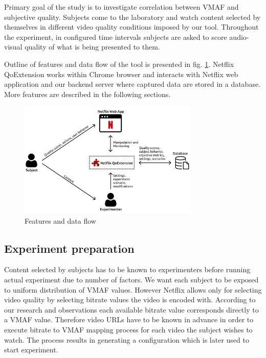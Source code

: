 \documentclass[conference]{IEEEtran}
\begin{document}
Primary goal of the study is to investigate correlation between VMAF \cite{VMAF} and subjective quality. 
Subjects come to the laboratory and watch content selected by themselves in different video quality conditions imposed by our tool. 
Throughout the experiment, in configured time intervals subjects are asked to score audio-visual quality of what is being presented to them.

Outline of features and data flow of the tool is presented in fig. \ref{Figure:fig_features}.
Netflix QoExtension works within Chrome browser and interacts with Netflix web application and our backend server where captured data are stored in a database. More features are described in the following sections.

\begin{figure}[h]
      \includegraphics[width=3.38in]{assets/NetflixQoExtensionV2.png}
      \caption{Features and data flow}
      \label{Figure:fig_features}
\end{figure}

\subsection{Experiment preparation}
Content selected by subjects has to be known to experimenters before running actual experiment due to number of factors. We want each subject to be exposed to uniform distribution of VMAF values. However Netflix allows only for selecting video quality by selecting bitrate values the video is encoded with. According to our research and observations each available bitrate value corresponds directly to a VMAF value. Therefore video URLs have to be known in advance in order to execute bitrate to VMAF mapping process for each video the subject wishes to watch. 
The process results in generating a configuration which is later used to start experiment.
\end{document}
